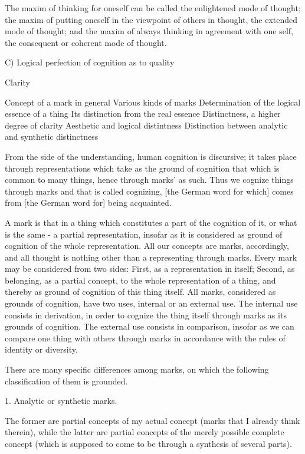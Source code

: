     The maxim of thinking for oneself can be called
    the enlightened mode of thought;
    the maxim of putting oneself in the viewpoint of others in thought,
    the extended mode of thought;
    and the maxim of always thinking in agreement with one self,
    the consequent or coherent mode of thought.

    C) Logical perfection of cognition as to quality

    Clarity

        Concept of a mark in general
        Various kinds of marks
        Determination of the logical essence of a thing
        Its distinction from the real essence
        Distinctness, a higher degree of clarity
        Aesthetic and logical distintness
        Distinction between analytic and synthetic distinctness

    From the side of the understanding, human cognition is discursive;
    it takes place through representations which take as the ground of cognition
    that which is common to many things, hence through marks' as such.
    Thus we cognize things through marks and that is called cognizing,
    [the German word for which] comes from [the German word for] being acquainted.

    A mark is that in a thing which constitutes
    a part of the cognition of it, or
    what is the same - a partial representation,
    insofar as it is considered as
    ground of cognition of the whole representation.
    All our concepts are marks, accordingly, and
    all thought is nothing other than a representing through marks.
    Every mark may be considered from two sides:
    First, as a representation in itself;
    Second, as belonging, as a partial concept, to
    the whole representation of a thing, and thereby
    as ground of cognition of this thing itself.
    All marks, considered as grounds of cognition, have two uses,
    internal or an external use.
    The internal use consists in derivation,
    in order to cognize the thing itself
    through marks as its grounds of cognition.
    The external use consists in comparison,
    insofar as we can compare one thing with others
    through marks in accordance with the rules of
    identity or diversity.

    There are many specific differences among marks,
    on which the following classification of them is grounded.

    1. Analytic or synthetic marks.

    The former are partial concepts of my actual concept
    (marks that I already think therein),
    while the latter are partial concepts of the merely possible complete concept
    (which is supposed to come to be through a synthesis of several parts).

